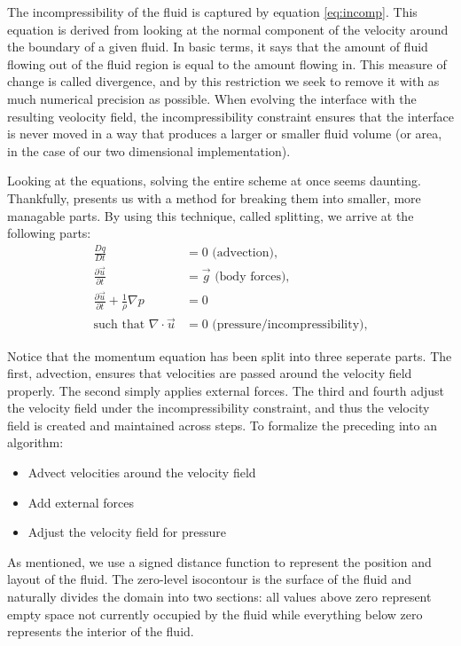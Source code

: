 The incompressibility of the fluid is captured by equation
\vref{eq:incomp}. This equation is derived from looking at the normal
component of the velocity around the boundary of a given fluid. In
basic terms, it says that the amount of fluid flowing out of the fluid
region is equal to the amount flowing in. This measure of change is
called divergence, and by this restriction we seek to remove it with
as much numerical precision as possible. When evolving the interface
with the resulting veolocity field, the incompressibility constraint
ensures that the interface is never moved in a way that produces a
larger or smaller fluid volume (or area, in the case of our two
dimensional implementation).

Looking at the equations, solving the entire scheme at once seems
daunting. Thankfully,  presents us with a method
for breaking them into smaller, more managable parts. By using this
technique, called splitting, we arrive at the following parts:
\begin{align}
  \label{eq:advection}
  \frac{Dq}{Dt}&=0 \text{    (advection),}\\
  \label{eq:forces}
  \frac{\partial \vec{u}}{\partial t} &= \vec{g} \text{    (body forces),}\\
  \label{eq:pressure}
  \frac{\partial \vec{u}}{\partial t} + \frac{1}{\rho}\nabla p &= 0\\
  \label{eq:divergence}
  \text{such that } \nabla\cdot\vec{u}&=0 \text{    (pressure/incompressibility),}
\end{align}

Notice that the momentum equation has been split into three seperate
parts. The first, advection, ensures that velocities are passed around
the velocity field properly. The second simply applies external
forces. The third and fourth adjust the velocity field under the
incompressibility constraint, and thus the velocity field is created
and maintained across steps. To formalize the preceding into an
algorithm:
\begin{itemize}
\item Advect velocities around the velocity field
\item Add external forces
\item Adjust the velocity field for pressure
\end{itemize}
As mentioned, we use a signed distance function to represent the
position and layout of the fluid. The zero-level isocontour is the
surface of the fluid and naturally divides the domain into two
sections: all values above zero represent empty space not currently
occupied by the fluid while everything below zero represents the
interior of the fluid.

